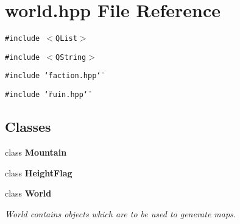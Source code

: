 \section{world.hpp File Reference}
\label{world_8hpp}
{\tt \#include $<$QList$>$}\par
{\tt \#include $<$QString$>$}\par
{\tt \#include \char`\"{}faction.hpp\char`\"{}}\par
{\tt \#include \char`\"{}ruin.hpp\char`\"{}}\par
\subsection*{Classes}
\begin{CompactItemize}
\item 
class {\bf Mountain}
\item 
class {\bf Height\-Flag}
\item 
class {\bf World}
\begin{CompactList}\small\item\em World contains objects which are to be used to generate maps. \item\end{CompactList}\end{CompactItemize}
